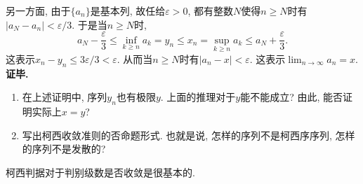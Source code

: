 另一方面, 由于$\{a_n\}$是基本列, 故任给$\varepsilon>0$, 都有整数$N$使得$n\geq N$时有$|a_N-a_n|<\varepsilon/3$. 于是当$n\geq N$时,
$$
a_N-\frac{\varepsilon}{3}\leq \inf_{k\geq n}a_k=y_n
\leq x_n=\sup_{k\geq n}a_k\leq a_N+\frac{\varepsilon}{3}.
$$
这表示$x_n-y_n\leq 3\varepsilon/3<\varepsilon$. 从而当$n\geq N$时有$|a_n-x|<\varepsilon$. 这表示$\lim_{n\to\infty}a_n=x$.\textbf{证毕.}

\begin{exercise}{}
\begin{enumerate}
\item 在上述证明中, 序列$y_n$也有极限$y$. 上面的推理对于$y$能不能成立? 由此, 能否证明实际上$x=y$?
\item 写出柯西收敛准则的否命题形式. 也就是说, 怎样的序列不是柯西序序列, 怎样的序列不是发散的?
\end{enumerate}
\end{exercise}

柯西判据对于判别级数是否收敛是很基本的.
